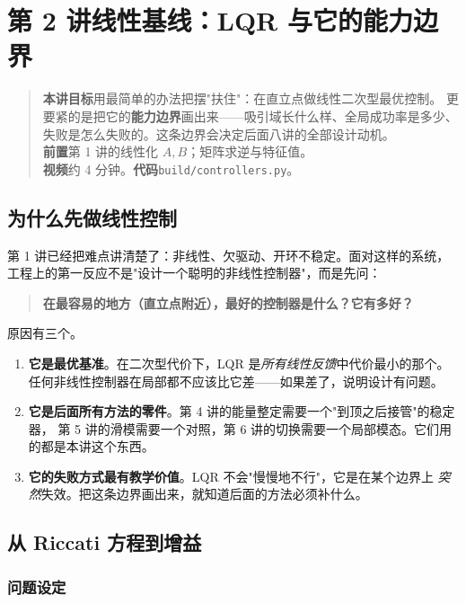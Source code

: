 \chapter[线性基线]{第 2 讲\quad 线性基线：LQR 与它的能力边界}
\label{ch:lqr}

\begin{quote}\small
\textbf{本讲目标}\quad 用最简单的办法把摆"扶住"：在直立点做线性二次型最优控制。
更要紧的是把它的\textbf{能力边界}画出来——吸引域长什么样、全局成功率是多少、
失败是怎么失败的。这条边界会决定后面八讲的全部设计动机。\\[2pt]
\textbf{前置}\quad 第 1 讲的线性化 $A,B$；矩阵求逆与特征值。\\
\textbf{视频}\quad 约 4 分钟。\quad\textbf{代码}\quad \texttt{build/controllers.py}。
\end{quote}

\section{为什么先做线性控制}

第 1 讲已经把难点讲清楚了：非线性、欠驱动、开环不稳定。面对这样的系统，
工程上的第一反应不是"设计一个聪明的非线性控制器"，而是先问：

\begin{quote}
\textbf{在最容易的地方（直立点附近），最好的控制器是什么？它有多好？}
\end{quote}

原因有三个。

\begin{enumerate}[leftmargin=2em,itemsep=3pt]
  \item \textbf{它是最优基准}。在二次型代价下，LQR 是\emph{所有线性反馈}中代价最小的那个。
        任何非线性控制器在局部都不应该比它差——如果差了，说明设计有问题。
  \item \textbf{它是后面所有方法的零件}。第 4 讲的能量整定需要一个"到顶之后接管"的稳定器，
        第 5 讲的滑模需要一个对照，第 6 讲的切换需要一个局部模态。它们用的都是本讲这个东西。
  \item \textbf{它的失败方式最有教学价值}。LQR 不会"慢慢地不行"，它是在某个边界上
        \emph{突然}失效。把这条边界画出来，就知道后面的方法必须补什么。
\end{enumerate}

\section{从 Riccati 方程到增益}

\subsection{问题设定}

